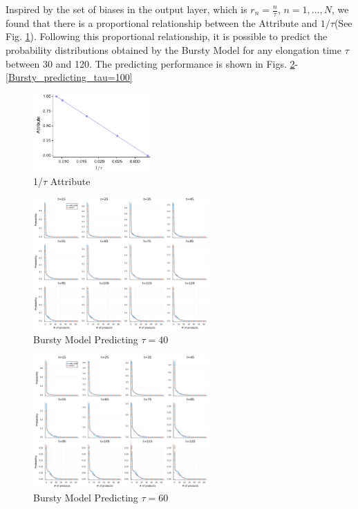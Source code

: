 \documentclass[a4paper,10pt]{article}
\begin{document}
Inspired by the set of biases in the output layer, which is $r_n=\frac{n}{\tau}$\cite{jiang2021neural}, $n=1,...,N$, we found that there is a proportional relationship between the Attribute and $1/\tau$(See Fig. \ref{tau_Attribute}). Following this proportional relationship, it is possible to predict the probability distributions obtained by the Bursty Model for any elongation time $\tau$ between 30 and 120. The predicting performance is shown in Figs. \ref{Bursty_predicting_tau=40}-\ref{Bursty_predicting_tau=100}
\begin{figure}[h]
	\centering
	\includegraphics[width=0.4\textwidth]{Figs/tau_Attribute.pdf}
	\caption{1/$\tau$ Attribute}\label{tau_Attribute}  
\end{figure}
\begin{figure}[h]
	\centering
	\includegraphics[width=0.6\textwidth]{Figs/Bursty_predicting_tau=40.pdf}
	\caption{Bursty Model Predicting $\tau=40$}\label{Bursty_predicting_tau=40}  
\end{figure}
\begin{figure}[h]
	\centering
	\includegraphics[width=0.6\textwidth]{Figs/Bursty_predicting_tau=60.pdf}
	\caption{Bursty Model Predicting $\tau=60$}\label{Bursty_predicting_tau=60}  
\end{figure}
\end{document}
